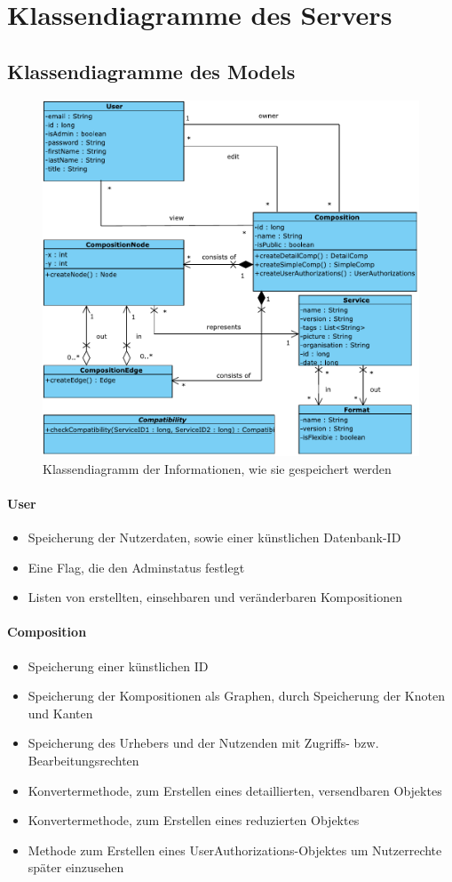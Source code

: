 

\section*{Klassendiagramme des Servers}

\subsection*{Klassendiagramme des Models}
\begin{figure}[!h]
	\centering
	\includegraphics[width=.75\textwidth]{img/Diagramme/Klassen/PureModel}
	\caption{Klassendiagramm der Informationen, wie sie gespeichert werden}
	\label{fig:klassendiagramm-model}
\end{figure}

\paragraph{User}
\begin{itemize}
		\item Speicherung der Nutzerdaten, sowie einer künstlichen Datenbank-ID
		\item Eine Flag, die den Adminstatus festlegt
		\item Listen von erstellten, einsehbaren und veränderbaren Kompositionen
\end{itemize}

\paragraph{Composition}
\begin{itemize}
	\item Speicherung einer künstlichen ID
	\item Speicherung der Kompositionen als Graphen, durch Speicherung der Knoten und Kanten
	\item Speicherung des Urhebers und der Nutzenden mit Zugriffs- bzw. Bearbeitungsrechten
	\item Konvertermethode, zum Erstellen eines detaillierten, versendbaren Objektes
	\item Konvertermethode, zum Erstellen eines reduzierten Objektes
	\item Methode zum Erstellen eines UserAuthorizations-Objektes um Nutzerrechte später einzusehen
\end{itemize} 

